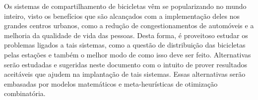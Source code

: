 Os sistemas de compartilhamento de bicicletas vêm se popularizando no mundo inteiro, visto os benefícios que são alcançados com a implementação deles nos grandes centros urbanos, como a redução de congestionamentos de automóveis e a melhoria da qualidade de vida das pessoas. Desta forma, é proveitoso estudar os problemas ligados a tais sistemas, como a questão de distribuição das bicicletas pelas estações e também o melhor modo de como isso deve ser feito. Alternativas serão estudadas e sugeridas neste documento com o intuito de prover resultados aceitáveis que ajudem na implantação de tais sistemas. Essas alternativas serão embasadas por modelos matemáticos e meta-heurísticas de otimização combinatória.